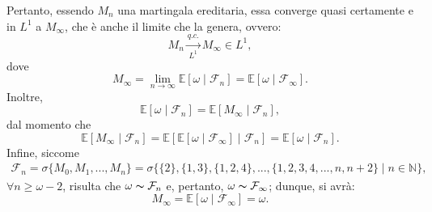 \documentclass[11pt,largemargins]{homework}
\begin{document}
\begin{enumerate}
\begin{equation*}
   \end{equation*}
   Pertanto, essendo $M_{n}$ una martingala ereditaria, essa converge quasi certamente e in $L^{1}$ a $M_{\infty}$, che è anche il limite che la genera, ovvero:
   \begin{equation*}
   M_{n}\xrightarrow[L^{1}]{q.c.}M_{\infty}\in L^{1},
   \end{equation*}
   dove
   \begin{equation*}
   M_{\infty}=\lim\limits_{n\rightarrow\infty}\mathbb{E}[\omega\mid \mathcal{F}_{n}]=\mathbb{E}[\omega\mid\mathcal{F}_{\infty}].
   \end{equation*}
   Inoltre,
   \begin{equation*}
   \mathbb{E}[\omega\mid \mathcal{F}_{n}]=\mathbb{E}[M_{\infty}\mid \mathcal{F}_{n}],
   \end{equation*}
   dal momento che
   \begin{equation*}
   \mathbb{E}[M_{\infty}\mid \mathcal{F}_{n}]=\mathbb{E}[\mathbb{E}[\omega\mid \mathcal{F}_{\infty}]\mid\mathcal{F}_{n}]=\mathbb{E}[\omega\mid\mathcal{F}_{n}].
   \end{equation*}
   Infine, siccome
   \begin{align*}
   \mathcal{F}_{n}=\sigma\{M_{0},M_{1},...,M_{n}\}=\sigma\{\{2\},\{1,3\},\{1,2,4\},...,\{1,2,3,4,...,n,n+2\}\mid n\in \mathbb{N}\},
   \end{align*}
   $\forall n\geq \omega-2$, risulta che $\omega \thicksim \mathcal{F}_{n}$ e, pertanto, $\omega \thicksim \mathcal{F}_{\infty}$; dunque, si avrà:
   \begin{equation*}
   M_{\infty}=\mathbb{E}[\omega\mid \mathcal{F}_{\infty}]=\omega.
   \end{equation*}
   
   
  \end{enumerate}
  
  
  \newpage
\end{document}
